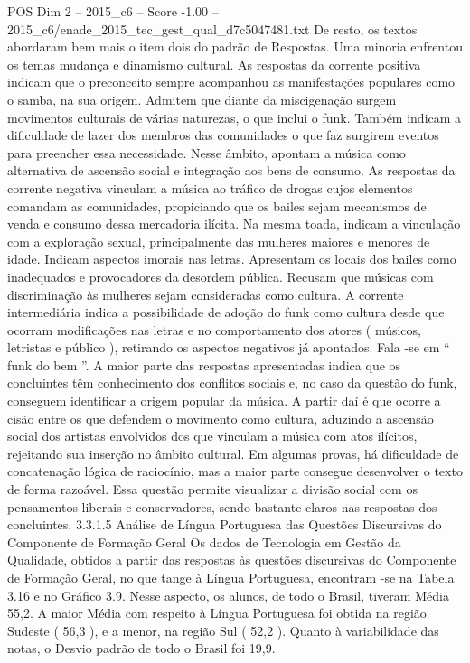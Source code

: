 \begin{textsample}{POS Dim 2 – 2015\_c6 – Score -1.00 – 2015\_c6/enade\_2015\_tec\_gest\_qual\_d7c5047481.txt}
De resto, os textos abordaram bem mais o item dois do padrão de Respostas.
Uma minoria enfrentou os temas mudança e dinamismo cultural.
As respostas da corrente positiva indicam que o preconceito sempre acompanhou as manifestações populares como o samba, na sua origem.
Admitem que diante da miscigenação surgem movimentos culturais de várias naturezas, o que inclui o funk.
Também indicam a dificuldade de lazer dos membros das comunidades o que faz surgirem eventos para preencher essa necessidade.
Nesse âmbito, apontam a música como alternativa de ascensão social e integração aos bens de consumo.
As respostas da corrente negativa vinculam a música ao tráfico de drogas cujos elementos comandam as comunidades, propiciando que os bailes sejam mecanismos de venda e consumo dessa mercadoria ilícita.
Na mesma toada, indicam a vinculação com a exploração sexual, principalmente das mulheres maiores e menores de idade.
Indicam aspectos imorais nas letras.
Apresentam os locais dos bailes como inadequados e provocadores da desordem pública.
Recusam que músicas com discriminação às mulheres sejam consideradas como cultura.
A corrente intermediária indica a possibilidade de adoção do funk como cultura desde que ocorram modificações nas letras e no comportamento dos atores ( músicos, letristas e público ), retirando os aspectos negativos já apontados.
Fala -se em “ funk do bem ”.
A maior parte das respostas apresentadas indica que os concluintes têm conhecimento dos conflitos sociais e, no caso da questão do funk, conseguem identificar a origem popular da música.
A partir daí é que ocorre a cisão entre os que defendem o movimento como cultura, aduzindo a ascensão social dos artistas envolvidos dos que vinculam a música com atos ilícitos, rejeitando sua inserção no âmbito cultural.
Em algumas provas, há dificuldade de concatenação lógica de raciocínio, mas a maior parte consegue desenvolver o texto de forma razoável.
Essa questão permite visualizar a divisão social com os pensamentos liberais e conservadores, sendo bastante claros nas respostas dos concluintes. 3.3.1.5 Análise de Língua Portuguesa das Questões Discursivas do Componente de Formação Geral Os dados de Tecnologia em Gestão da Qualidade, obtidos a partir das respostas às questões discursivas do Componente de Formação Geral, no que tange à Língua Portuguesa, encontram -se na Tabela 3.16 e no Gráfico 3.9.
Nesse aspecto, os alunos, de todo o Brasil, tiveram Média 55,2.
A maior Média com respeito à Língua Portuguesa foi obtida na região Sudeste ( 56,3 ), e a menor, na região Sul ( 52,2 ).
Quanto à variabilidade das notas, o Desvio padrão de todo o Brasil foi 19,9.

\end{textsample}
